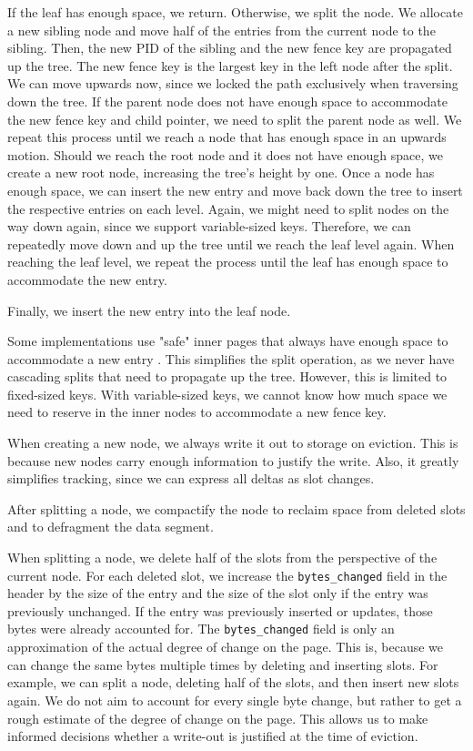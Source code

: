 If the leaf has enough space, we return.
Otherwise, we split the node.
We allocate a new sibling node and move half of the entries from the current node to the sibling.
Then, the new \ac{PID} of the sibling and the new fence key are propagated up the tree.
The new fence key is the largest key in the left node after the split.
We can move upwards now, since we locked the path exclusively when traversing down the tree.
If the parent node does not have enough space to accommodate the new fence key and child pointer, we need to split the parent node as well.
We repeat this process until we reach a node that has enough space in an upwards motion.
Should we reach the root node and it does not have enough space, we create a new root node, increasing the tree's height by one.
Once a node has enough space, we can insert the new entry and move back down the tree to insert the respective entries on each level.
Again, we might need to split nodes on the way down again, since we support variable-sized keys.
Therefore, we can repeatedly move down and up the tree until we reach the leaf level again.
When reaching the leaf level, we repeat the process until the leaf has enough space to accommodate the new entry.

Finally, we insert the new entry into the leaf node.

Some implementations use "safe" inner pages that always have enough space to accommodate a new entry \cite{mdbs2024slides}.
This simplifies the split operation, as we never have cascading splits that need to propagate up the tree.
However, this is limited to fixed-sized keys.
With variable-sized keys, we cannot know how much space we need to reserve in the inner nodes to accommodate a new fence key.

When creating a new node, we always write it out to storage on eviction.
This is because new nodes carry enough information to justify the write.
Also, it greatly simplifies tracking, since we can express all deltas as slot changes.

After splitting a node, we compactify the node to reclaim space from deleted slots and to defragment the data segment.

When splitting a node, we delete half of the slots from the perspective of the current node.
For each deleted slot, we increase the \texttt{bytes\_changed} field in the header by the size of the entry and the size of the slot only if the entry was previously unchanged.
If the entry was previously inserted or updates, those bytes were already accounted for.
The \texttt{bytes\_changed} field is only an approximation of the actual degree of change on the page.
This is, because we can change the same bytes multiple times by deleting and inserting slots.
For example, we can split a node, deleting half of the slots, and then insert new slots again.
We do not aim to account for every single byte change, but rather to get a rough estimate of the degree of change on the page.
This allows us to make informed decisions whether a write-out is justified at the time of eviction.

